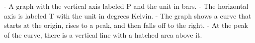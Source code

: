 - A graph with the vertical axis labeled P and the unit in bars.
- The horizontal axis is labeled T with the unit in degrees Kelvin.
- The graph shows a curve that starts at the origin, rises to a peak, and then falls off to the right.
- At the peak of the curve, there is a vertical line with a hatched area above it.